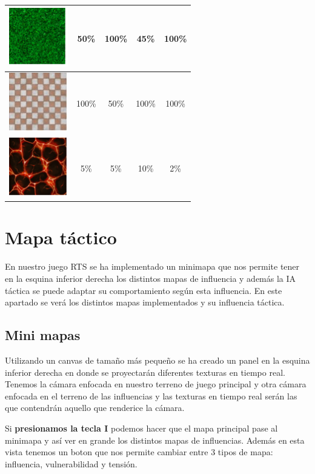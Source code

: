 \begin{table}[H]
\begin{tabular}{|c|c|c|c|c|}
        \hline
        \includegraphics{imagesTable/hierba} & 50\% & 100\% & 45\% & 100\% \\
        \hline
        \includegraphics{imagesTable/suelo} & 100\% & 50\% & 100\% & 100\% \\
        \hline
        \includegraphics{imagesTable/lava} & 5\% & 5\% & 10\% & 2\% \\
        \hline
    \end{tabular}
\end{table}


\section{Mapa táctico}
En nuestro juego RTS se ha implementado un minimapa que nos permite tener en la esquina inferior derecha los distintos mapas de influencia y además la IA táctica se puede adaptar su comportamiento según esta influencia. En este apartado se verá los distintos mapas implementados y su influencia táctica.

\subsection{Mini mapas}
Utilizando un canvas de tamaño más pequeño se ha creado un panel en la esquina inferior derecha en donde se proyectarán diferentes texturas en tiempo real. Tenemos la cámara enfocada en nuestro terreno de juego principal y otra cámara enfocada en el terreno de las influencias y las texturas en tiempo real serán las que contendrán aquello que renderice la cámara. 

Si \textbf{presionamos la tecla I} podemos hacer que el mapa principal pase al minimapa y así ver en grande los distintos mapas de influencias.  Además en esta vista tenemos un boton que nos permite cambiar entre 3 tipos de mapa: influencia, vulnerabilidad y tensión.
